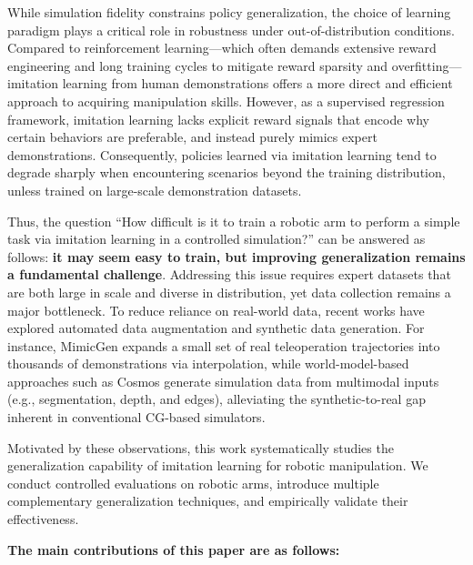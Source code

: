 \documentclass{article} %
\begin{document}
While simulation fidelity constrains policy generalization, the choice of learning paradigm plays a critical role in robustness under out-of-distribution conditions. Compared to reinforcement learning—which often demands extensive reward engineering and long training cycles to mitigate reward sparsity and overfitting—imitation learning from human demonstrations offers a more direct and efficient approach to acquiring manipulation skills\cite{torne2024reconcilingrealitysimulationrealtosimtoreal}\cite{wang2025recipeefficientsimtorealtransfer}. However, as a supervised regression framework, imitation learning lacks explicit reward signals that encode why certain behaviors are preferable, and instead purely mimics expert demonstrations. Consequently, policies learned via imitation learning tend to degrade sharply when encountering scenarios beyond the training distribution, unless trained on large-scale demonstration datasets.

Thus, the question “How difficult is it to train a robotic arm to perform a simple task via imitation learning in a controlled simulation?” can be answered as follows: {\bf it may seem easy to train, but improving generalization remains a fundamental challenge}. Addressing this issue requires expert datasets that are both large in scale and diverse in distribution, yet data collection remains a major bottleneck. To reduce reliance on real-world data, recent works have explored automated data augmentation and synthetic data generation. For instance, MimicGen expands a small set of real teleoperation trajectories into thousands of demonstrations via interpolation, while world-model-based approaches such as Cosmos generate simulation data from multimodal inputs (e.g., segmentation, depth, and edges), alleviating the synthetic-to-real gap inherent in conventional CG-based simulators\cite{zhang2025stepworldmodelssurvey}.

Motivated by these observations, this work systematically studies the generalization capability of imitation learning for robotic manipulation. We conduct controlled evaluations on robotic arms, introduce multiple complementary generalization techniques, and empirically validate their effectiveness.

\textbf{ The main contributions of this paper are as follows:}
\end{document}
